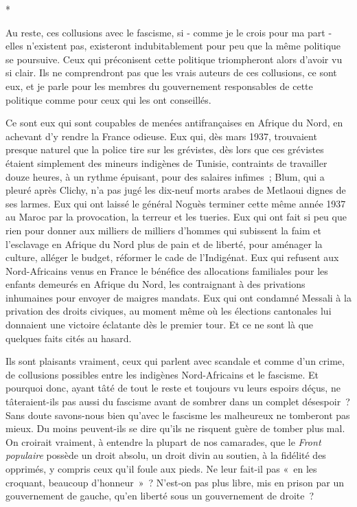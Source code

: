 \documentclass[french,twoside]{book} %
\begin{document}
\begin{center}
*\end{center}
\noindent Au reste, ces collusions avec le fascisme, si - comme je le crois pour ma part - elles n'existent pas, existeront indubitablement pour peu que la même politique se poursuive. Ceux qui préconisent cette politique triompheront alors d'avoir vu si clair. Ils ne comprendront pas que les vrais auteurs de ces collusions, ce sont eux, et je parle pour les membres du gouvernement respon­sables de cette politique comme pour ceux qui les ont conseillés.\par
Ce sont eux qui sont coupables de menées antifrançaises en Afrique du Nord, en achevant d'y rendre la France odieuse. Eux qui, dès mars 1937, trouvaient presque naturel que la police tire sur les grévistes, dès lors que ces grévistes étaient simplement des mineurs indigènes de Tunisie, contraints de travailler douze heures, à un rythme épuisant, pour des salaires infimes ; Blum, qui a pleuré après Clichy, n'a pas jugé les dix-neuf morts arabes de Metlaoui dignes de ses larmes. Eux qui ont laissé le général Noguès terminer cette même année 1937 au Maroc par la provocation, la terreur et les tueries. Eux qui ont fait si peu que rien pour donner aux milliers de milliers d'hommes qui subissent la faim et l'esclavage en Afrique du Nord plus de pain et de liberté, pour aménager la culture, alléger le budget, réformer le cade de l'Indigénat. Eux qui refusent aux Nord-Africains venus en France le bénéfice des allocations familiales pour les enfants demeurés en Afrique du Nord, les contraignant à des privations inhumaines pour envoyer de maigres mandats. Eux qui ont condamné Messali à la privation des droits civiques, au moment même où les élections cantonales lui donnaient une victoire éclatante dès le premier tour. Et ce ne sont là que quelques faits cités au hasard.\par
Ils sont plaisants vraiment, ceux qui parlent avec scandale et comme d'un crime, de collusions possibles entre les indigènes Nord-Africains et le fascisme. Et pourquoi donc, ayant tâté de tout le reste et toujours vu leurs espoirs déçus, ne tâteraient-ils pas aussi du fascisme avant de sombrer dans un complet désespoir ? Sans doute savons-nous bien qu'avec le fascisme les malheureux ne tomberont pas mieux. Du moins peuvent-ils se dire qu'ils ne risquent guère de tomber plus mal. On croirait vraiment, à entendre la plupart de nos camarades, que le {\itshape Front populaire} possède un droit absolu, un droit divin au soutien, à la fidélité des opprimés, y compris ceux qu'il foule aux pieds. Ne leur fait-il pas « en les croquant, beaucoup d'honneur » ? N'est-on pas plus libre, mis en prison par un gouvernement de gauche, qu'en liberté sous un gouvernement de droite ?\par
\end{document}
